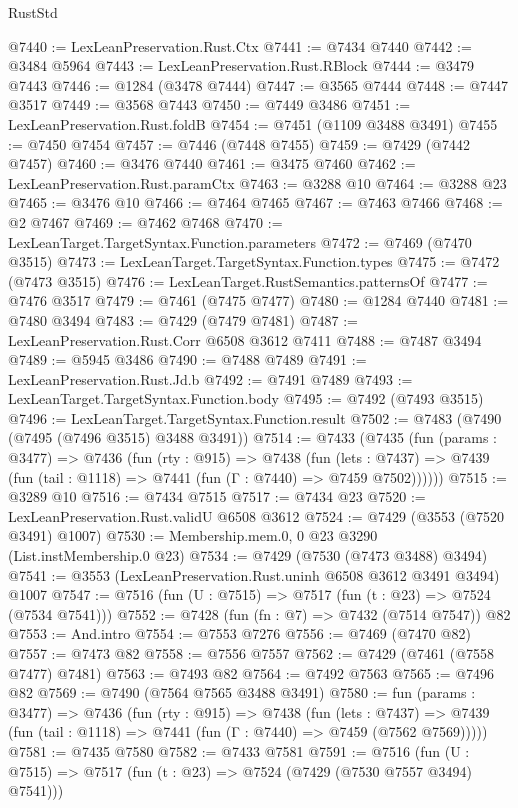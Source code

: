 \begin{lexlean}{RustStd}
\begin{coremodule}
@7440 := LexLeanPreservation.Rust.Ctx
@7441 := @7434 @7440
@7442 := @3484 @5964
@7443 := LexLeanPreservation.Rust.RBlock
@7444 := @3479 @7443
@7446 := @1284 (@3478 @7444)
@7447 := @3565 @7444
@7448 := @7447 @3517
@7449 := @3568 @7443
@7450 := @7449 @3486
@7451 := LexLeanPreservation.Rust.foldB
@7454 := @7451 (@1109 @3488 @3491)
@7455 := @7450 @7454
@7457 := @7446 (@7448 @7455)
@7459 := @7429 (@7442 @7457)
@7460 := @3476 @7440
@7461 := @3475 @7460
@7462 := LexLeanPreservation.Rust.paramCtx
@7463 := @3288 @10
@7464 := @3288 @23
@7465 := @3476 @10
@7466 := @7464 @7465
@7467 := @7463 @7466
@7468 := @2 @7467
@7469 := @7462 @7468
@7470 := LexLeanTarget.TargetSyntax.Function.parameters
@7472 := @7469 (@7470 @3515)
@7473 := LexLeanTarget.TargetSyntax.Function.types
@7475 := @7472 (@7473 @3515)
@7476 := LexLeanTarget.RustSemantics.patternsOf
@7477 := @7476 @3517
@7479 := @7461 (@7475 @7477)
@7480 := @1284 @7440
@7481 := @7480 @3494
@7483 := @7429 (@7479 @7481)
@7487 := LexLeanPreservation.Rust.Corr @6508 @3612 @7411
@7488 := @7487 @3494
@7489 := @5945 @3486
@7490 := @7488 @7489
@7491 := LexLeanPreservation.Rust.Jd.b
@7492 := @7491 @7489
@7493 := LexLeanTarget.TargetSyntax.Function.body
@7495 := @7492 (@7493 @3515)
@7496 := LexLeanTarget.TargetSyntax.Function.result
@7502 := @7483 (@7490 (@7495 (@7496 @3515) @3488 @3491))
@7514 := @7433
    (@7435
      (fun (params : @3477) =>
      @7436
        (fun (rty : @915) =>
        @7438
          (fun (lets : @7437) =>
          @7439 (fun (tail : @1118) => @7441 (fun (Γ : @7440) => @7459 @7502))))))
@7515 := @3289 @10
@7516 := @7434 @7515
@7517 := @7434 @23
@7520 := LexLeanPreservation.Rust.validU @6508 @3612
@7524 := @7429 (@3553 (@7520 @3491) @1007)
@7530 := Membership.mem.{0, 0} @23 @3290 (List.instMembership.{0} @23)
@7534 := @7429 (@7530 (@7473 @3488) @3494)
@7541 := @3553 (LexLeanPreservation.Rust.uninh @6508 @3612 @3491 @3494) @1007
@7547 := @7516 (fun (U : @7515) => @7517 (fun (t : @23) => @7524 (@7534 @7541)))
@7552 := @7428 (fun (fn : @7) => @7432 (@7514 @7547)) @82
@7553 := And.intro
@7554 := @7553 @7276
@7556 := @7469 (@7470 @82)
@7557 := @7473 @82
@7558 := @7556 @7557
@7562 := @7429 (@7461 (@7558 @7477) @7481)
@7563 := @7493 @82
@7564 := @7492 @7563
@7565 := @7496 @82
@7569 := @7490 (@7564 @7565 @3488 @3491)
@7580 := fun (params : @3477) =>
  @7436
    (fun (rty : @915) =>
    @7438
      (fun (lets : @7437) =>
      @7439 (fun (tail : @1118) => @7441 (fun (Γ : @7440) => @7459 (@7562 @7569)))))
@7581 := @7435 @7580
@7582 := @7433 @7581
@7591 := @7516 (fun (U : @7515) => @7517 (fun (t : @23) => @7524 (@7429 (@7530 @7557 @3494) @7541)))

\end{coremodule}
\end{lexlean}
